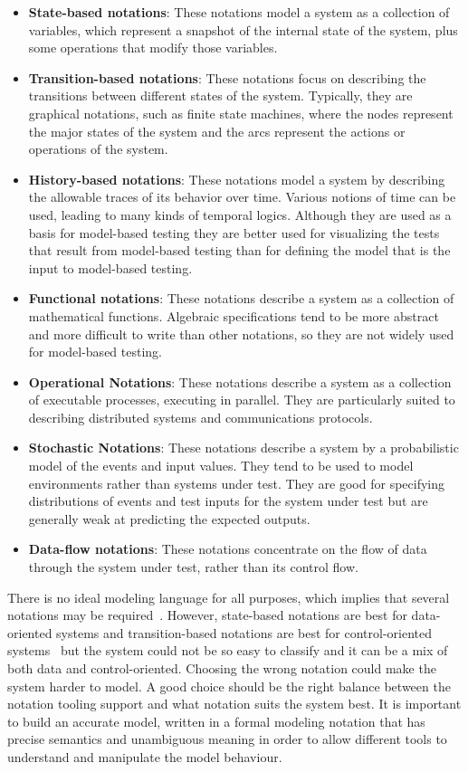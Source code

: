 \begin{itemize}
\item \textbf{State-based notations}: These notations model a system as a collection of
variables, which represent a snapshot of the internal state of the system, plus
some operations that modify those variables.
\item \textbf{Transition-based notations}: These notations focus on describing the
transitions between different states of the system. Typically, they are
graphical notations, such as finite state machines, where the nodes represent
the major states of the system and the arcs represent the actions or operations
of the system.
\item \textbf{History-based notations}:  These notations model a system by
describing the allowable traces of its behavior over time. Various notions of
time can be used, leading to many kinds of temporal logics. Although they are
used as a basis for model-based testing they are better used for visualizing the
tests that result from model-based testing than for defining the model that is
the input to model-based testing.
\item \textbf{Functional notations}: These notations describe a system as a
collection of mathematical functions. Algebraic specifications tend to be more
abstract and more difficult to write than other notations, so they are not
widely used for model-based testing.
\item \textbf{Operational Notations}: These notations describe a system as a
collection of executable processes, executing in parallel. They are particularly
suited to describing distributed systems and communications protocols.
\item \textbf{Stochastic Notations}: These notations describe a system by a
probabilistic model of the events and input values. They tend to be used to model
environments rather than systems under test. They are good for specifying
distributions of events and test inputs for the system under test but are
generally weak at predicting the expected outputs.
\item \textbf{Data-flow notations}: These notations concentrate on the flow of
data through the system under test, rather than its control flow.
\end{itemize}

There is no ideal modeling language for all purposes, which implies that several
notations may be required~\cite{Dalal1999}. However, state-based notations are
best for data-oriented systems and transition-based
notations are best for control-oriented systems~\cite{1200168} but the system
could not be so easy to classify and it can be a mix of both data and
control-oriented. Choosing the wrong notation could make the system harder to
model. A good choice should be the right balance between the notation tooling
support and what notation suits the system best. It is important to build
an accurate model, written in a formal modeling notation that has precise
semantics and unambiguous meaning in order to allow different tools to
understand and manipulate the model behaviour.

